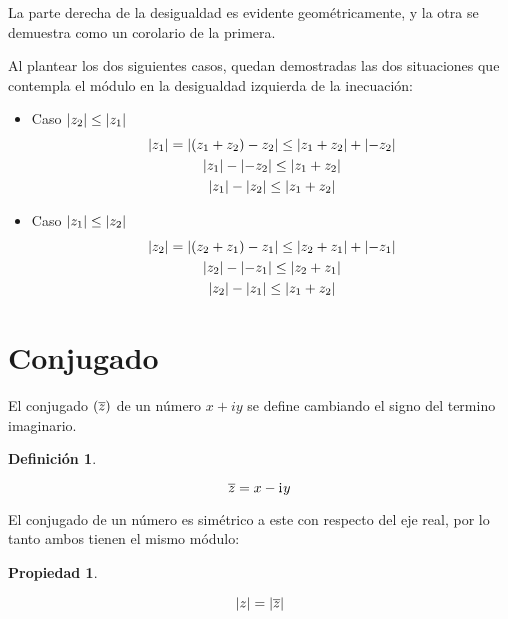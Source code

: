 \documentclass[a5paper,12pt,twoside]{book}
\newtheorem{defn}{{Definición}}[chapter]
\newtheorem{prop}{{Propiedad}}[chapter]
\begin{document}

La parte derecha de la desigualdad es evidente geométricamente, y la otra se demuestra como un corolario de la primera.

Al plantear los dos siguientes casos, quedan demostradas las dos situaciones que contempla el módulo en la desigualdad izquierda de la inecuación:

\begin{itemize}
    \item Caso ${\left| {z_2} \right|} \leq {\left| {z_1} \right|}$
    \begin{gather*}
        {\left| {z_1} \right|} = {\left| {(z_1+z_2)-z_2} \right|} \leq {\left| {z_1+z_2} \right|}+{\left| {-z_2} \right|}
        \\
        {\left| {z_1} \right|} - {\left| {-z_2} \right|} \leq {\left| {z_1+z_2} \right|}
        \\
        {\left| {z_1} \right|} - {\left| {z_2} \right|} \leq {\left| {z_1+z_2} \right|}
    \end{gather*}

    \item Caso ${\left| {z_1} \right|} \leq {\left| {z_2} \right|}$
    \begin{gather*}
        {\left| {z_2} \right|} = {\left| {(z_2+z_1)-z_1} \right|} \leq {\left| {z_2+z_1} \right|}+{\left| {-z_1} \right|}
        \\
        {\left| {z_2} \right|} - {\left| {-z_1} \right|} \leq {\left| {z_2+z_1} \right|}
        \\
        {\left| {z_2} \right|} - {\left| {z_1} \right|} \leq {\left| {z_1+z_2} \right|}
    \end{gather*}
\end{itemize}


\section{Conjugado}

El conjugado $(\overline{z})$ de un número $x+iy$ se define cambiando el signo del termino imaginario.

\begin{mdframed}[style=MyFrame1]
    \begin{defn}
        \label{defn:conjugate}
    \end{defn}
    \begin{equation*}
        \overline{z} = x - \mathrm{i}\mkern1mu y
    \end{equation*}
\end{mdframed}

El conjugado de un número es simétrico a este con respecto del eje real, por lo tanto ambos tienen el mismo módulo:

\begin{mdframed}[style=MyFrame1]
    \begin{prop}
    \end{prop}
    \begin{equation*}
        {\left| {z} \right|} = {\left| {\overline{z}} \right|}
    \end{equation*}
\end{mdframed}
\end{document}
